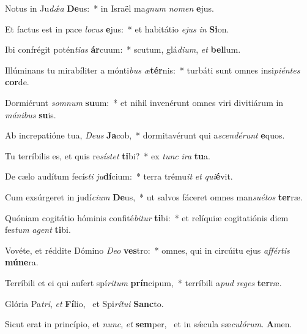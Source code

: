 \item Notus in Ju\textit{dǽ}\textit{a} \textbf{De}us:~* in Israël ma\textit{gnum} \textit{no}\textit{men} \textbf{e}jus.
\item Et factus est in pace \textit{lo}\textit{cus} \textbf{e}jus:~* et habitátio \textit{e}\textit{jus} \textit{in} \textbf{Si}on.
\item Ibi confrégit potén\textit{ti}\textit{as} \textbf{ár}cuum:~* scutum, glá\textit{di}\textit{um}, \textit{et} \textbf{bel}lum.
\item Illúminans tu mirabíliter a mónti\textit{bus} \textit{æ}\textbf{tér}nis:~* turbáti sunt omnes insi\textit{pi}\textit{én}\textit{tes} \textbf{cor}de.
\item Dormiérunt \textit{som}\textit{num} \textbf{su}um:~* et nihil invenérunt omnes viri divitiárum in \textit{má}\textit{ni}\textit{bus} \textbf{su}is.
\item Ab increpatióne tua, \textit{De}\textit{us} \textbf{Ja}cob,~* dormitavérunt qui a\textit{scen}\textit{dé}\textit{runt} \textbf{e}quos.
\item Tu terríbilis es, et quis re\textit{sís}\textit{tet} \textbf{ti}bi?~* ex \textit{tunc} \textit{i}\textit{ra} \textbf{tu}a.
\item De cælo audítum fecís\textit{ti} \textit{ju}\textbf{dí}cium:~* terra trému\textit{it} \textit{et} \textit{qui}\textbf{é}vit.
\item Cum exsúrgeret in judí\textit{ci}\textit{um} \textbf{De}us,~* ut salvos fáceret omnes man\textit{su}\textit{é}\textit{tos} \textbf{ter}ræ.
\item Quóniam cogitátio hóminis confité\textit{bi}\textit{tur} \textbf{ti}bi:~* et relíquiæ cogitatiónis diem fes\textit{tum} \textit{a}\textit{gent} \textbf{ti}bi.
\item Vovéte, et réddite Dómino \textit{De}\textit{o} \textbf{ves}tro:~* omnes, qui in circúitu ejus \textit{af}\textit{fér}\textit{tis} \textbf{mú}\textbf{ne}ra.
\item Terríbili et ei qui aufert spí\textit{ri}\textit{tum} \textbf{prín}cipum,~* terríbili a\textit{pud} \textit{re}\textit{ges} \textbf{ter}ræ.
\item Glória Pa\textit{tri}, \textit{et} \textbf{Fí}lio,~\psstar{} et Spi\textit{rí}\textit{tu}\textit{i} \textbf{Sanc}to.
\item Sicut erat in princípio, et \textit{nunc}, \textit{et} \textbf{sem}per,~\psstar{} et in sǽcula sæ\textit{cu}\textit{ló}\textit{rum}. \textbf{A}men.
